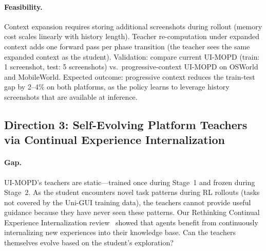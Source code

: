 \documentclass[11pt,a4paper]{article}
\begin{document}
\paragraph{Feasibility.} Context expansion requires storing additional screenshots during rollout (memory cost scales linearly with history length). Teacher re-computation under expanded context adds one forward pass per phase transition (the teacher sees the same expanded context as the student). Validation: compare current UI-MOPD (train: 1 screenshot, test: 5 screenshots) vs.\ progressive-context UI-MOPD on OSWorld and MobileWorld. Expected outcome: progressive context reduces the train-test gap by 2--4\% on both platforms, as the policy learns to leverage history screenshots that are available at inference.

\subsection{Direction 3: Self-Evolving Platform Teachers via Continual Experience Internalization}

\paragraph{Gap.} UI-MOPD's teachers are static---trained once during Stage~1 and frozen during Stage~2. As the student encounters novel task patterns during RL rollouts (tasks not covered by the Uni-GUI training data), the teachers cannot provide useful guidance because they have never seen these patterns. Our Rethinking Continual Experience Internalization review~\cite{rethinking2026} showed that agents benefit from continuously internalizing new experiences into their knowledge base. Can the teachers themselves evolve based on the student's exploration?
\end{document}
